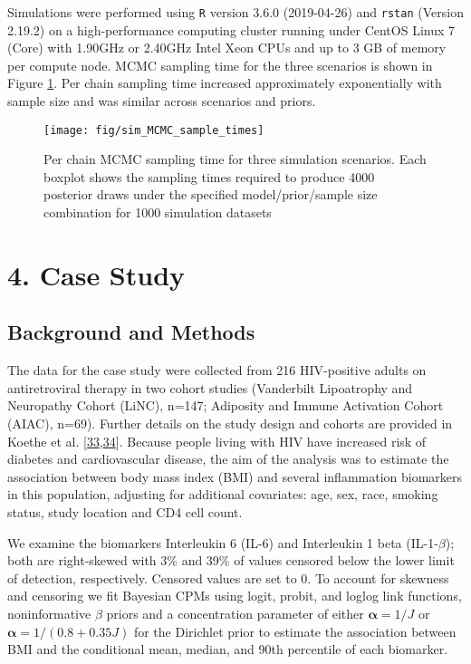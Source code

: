 \documentclass[
]{article}
\begin{document}
Simulations were performed using \texttt{R} version 3.6.0 (2019-04-26) and \texttt{rstan} (Version 2.19.2) on a high-performance computing cluster running under CentOS Linux 7 (Core) with 1.90GHz or 2.40GHz Intel Xeon CPUs and up to 3 GB of memory per compute node. MCMC sampling time for the three scenarios is shown in Figure \ref{fig:simplt-samptime}. Per chain sampling time increased approximately exponentially with sample size and was similar across scenarios and priors.

\begin{figure}

{\centering \texttt{[image: fig/sim\_MCMC\_sample\_times]} 

}

\caption{Per chain MCMC sampling time for three simulation scenarios. Each boxplot shows the sampling times required to produce 4000 posterior draws under the specified model/prior/sample size combination for 1000 simulation datasets}\label{fig:simplt-samptime}
\end{figure}

\hypertarget{case-study}{%
\section{4. Case Study}\label{case-study}}

\hypertarget{background-and-methods}{%
\subsection{Background and Methods}\label{background-and-methods}}

The data for the case study were collected from 216 HIV-positive adults on antiretroviral therapy in two cohort studies (Vanderbilt Lipoatrophy and Neuropathy Cohort (LiNC), n=147; Adiposity and Immune Activation Cohort (AIAC), n=69). Further details on the study design and cohorts are provided in Koethe et al. {[}\protect\hyperlink{ref-koethe_serum_2012}{33},\protect\hyperlink{ref-koethe_metabolic_2015}{34}{]}. Because people living with HIV have increased risk of diabetes and cardiovascular disease, the aim of the analysis was to estimate the association between body mass index (BMI) and several inflammation biomarkers in this population, adjusting for additional covariates: age, sex, race, smoking status, study location and CD4 cell count.

We examine the biomarkers Interleukin 6 (IL-6) and Interleukin 1 beta (IL-1-\(\beta\)); both are right-skewed with 3\% and 39\% of values censored below the lower limit of detection, respectively. Censored values are set to 0. To account for skewness and censoring we fit Bayesian CPMs using logit, probit, and loglog link functions, noninformative \(\beta\) priors and a concentration parameter of either \(\boldsymbol{\alpha}=1/J\) or \(\boldsymbol{\alpha}=1/(0.8+0.35J)\) for the Dirichlet prior to estimate the association between BMI and the conditional mean, median, and 90th percentile of each biomarker.
\end{document}
